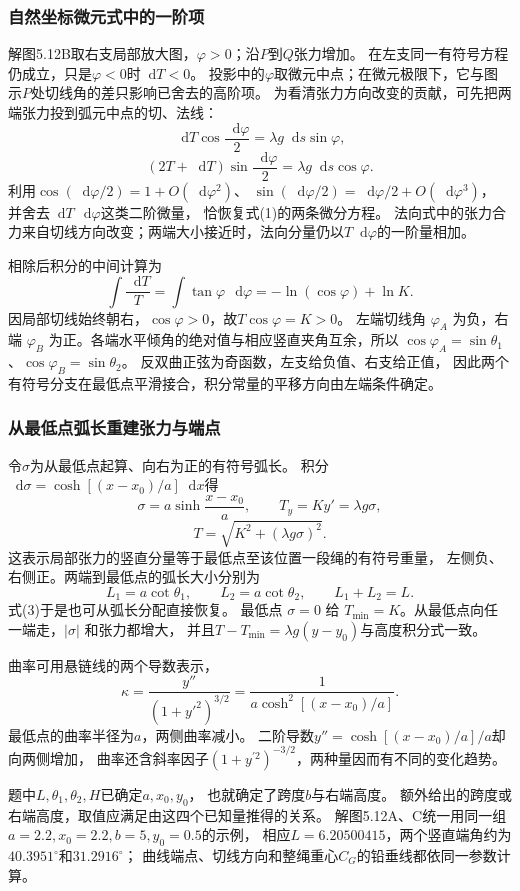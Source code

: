 \documentclass[UTF8,fontset=fandol,a4paper,11pt]{ctexart}
\newcommand{\dd}{\mathop{}\!\mathrm{d}}
\begin{document}
\subsubsection*{自然坐标微元式中的一阶项}
解图5.12B取右支局部放大图，$\varphi>0$；沿$P$到$Q$张力增加。
在左支同一有符号方程仍成立，只是$\varphi<0$时$\dd T<0$。
投影中的$\varphi$取微元中点；在微元极限下，它与图示$P$处切线角的差只影响已舍去的高阶项。
为看清张力方向改变的贡献，可先把两端张力投到弧元中点的切、法线：
\[
\dd T\cos\frac{\dd\varphi}{2}
=\lambda g\dd s\sin\varphi,
\]
\[
(2T+\dd T)\sin\frac{\dd\varphi}{2}
=\lambda g\dd s\cos\varphi.
\]
利用$\cos(\dd\varphi/2)=1+O(\dd\varphi^2)$、
$\sin(\dd\varphi/2)=\dd\varphi/2+O(\dd\varphi^3)$，
并舍去$\dd T\,\dd\varphi$这类二阶微量，
恰恢复式(1)的两条微分方程。
法向式中的张力合力来自切线方向改变；两端大小接近时，法向分量仍以$T\dd\varphi$的一阶量相加。

相除后积分的中间计算为
\[
\int\frac{\dd T}{T}
=\int\tan\varphi\,\dd\varphi
=-\ln(\cos\varphi)+\ln K.
\]
因局部切线始终朝右，$\cos\varphi>0$，故$T\cos\varphi=K>0$。
左端切线角 $\varphi_A$ 为负，右端 $\varphi_B$ 为正。各端水平倾角的绝对值与相应竖直夹角互余，所以 $\cos\varphi_A=\sin\theta_1$、$\cos\varphi_B=\sin\theta_2$。
反双曲正弦为奇函数，左支给负值、右支给正值，
因此两个有符号分支在最低点平滑接合，积分常量的平移方向由左端条件确定。

\subsubsection*{从最低点弧长重建张力与端点}
令$\sigma$为从最低点起算、向右为正的有符号弧长。
积分$\dd\sigma=\cosh[(x-x_0)/a]\dd x$得
\[
\sigma=a\sinh\frac{x-x_0}{a},\qquad
T_y=Ky'=\lambda g\sigma,
\]
\[
T=\sqrt{K^2+(\lambda g\sigma)^2}.
\]
这表示局部张力的竖直分量等于最低点至该位置一段绳的有符号重量，
左侧负、右侧正。两端到最低点的弧长大小分别为
\[
L_1=a\cot\theta_1,\qquad L_2=a\cot\theta_2,\qquad
L_1+L_2=L.
\]
式(3)于是也可从弧长分配直接恢复。
最低点 $\sigma=0$ 给 $T_{\min}=K$。从最低点向任一端走，$|\sigma|$ 和张力都增大，
并且$T-T_{\min}=\lambda g(y-y_0)$与高度积分式一致。

曲率可用悬链线的两个导数表示，
\[
\kappa=\frac{y''}{(1+y'^2)^{3/2}}
=\frac1{a\cosh^2[(x-x_0)/a]}.
\]
最低点的曲率半径为$a$，两侧曲率减小。
二阶导数$y''=\cosh[(x-x_0)/a]/a$却向两侧增加，
曲率还含斜率因子$(1+y^{\prime2})^{-3/2}$，两种量因而有不同的变化趋势。

题中$L,\theta_1,\theta_2,H$已确定$a,x_0,y_0$，
也就确定了跨度$b$与右端高度。
额外给出的跨度或右端高度，取值应满足由这四个已知量推得的关系。
解图5.12A、C统一用同一组$a=2.2,x_0=2.2,b=5,y_0=0.5$的示例，
相应$L=6.20500415$，两个竖直端角约为$40.3951^\circ$和$31.2916^\circ$；
曲线端点、切线方向和整绳重心$C_G$的铅垂线都依同一参数计算。
\end{document}
